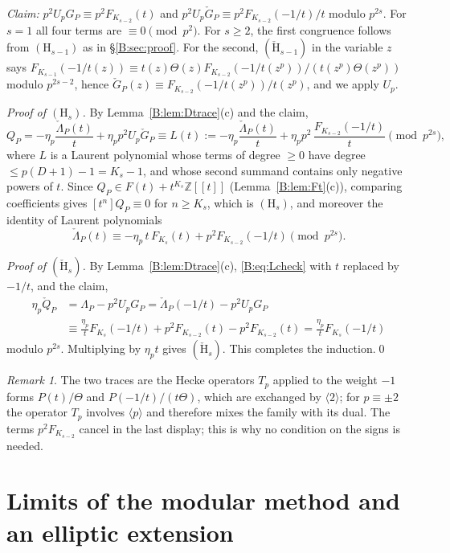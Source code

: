 \documentclass[11pt,a4paper]{article}
\theoremstyle{definition}\newtheorem{definition}[theorem]{Definition}
\theoremstyle{remark}\newtheorem{remark}[theorem]{Remark}
\newcommand{\Z}{\mathbb Z}
\numberwithin{equation}{section}
\begin{document}
\emph{Claim:} $p^2U_pG_P\equiv p^2F_{K_{s-2}}(t)$ and $p^2U_p\check G_P\equiv p^2F_{K_{s-2}}(-1/t)/t$ modulo $p^{2s}$. For
$s=1$ all four terms are $\equiv0\pmod{p^2}$. For $s\ge2$, the first congruence follows from $(\mathrm H_{s-1})$ as in
\S\ref{B:sec:proof}. For the second, $(\check{\mathrm H}_{s-1})$ in the variable $z$ says
$F_{K_{s-1}}(-1/t(z))\equiv t(z)\Theta(z)F_{K_{s-2}}(-1/t(z^p))/(t(z^p)\Theta(z^p))$ modulo $p^{2s-2}$, hence
$\check G_P(z)\equiv F_{K_{s-2}}(-1/t(z^p))/t(z^p)$, and we apply $U_p$.

\emph{Proof of $(\mathrm H_s)$.} By Lemma~\ref{B:lem:Dtrace}(c) and the claim,
\[
Q_P=-\eta_p\frac{\check\Lambda_P(t)}t+\eta_pp^2U_p\check G_P\equiv L(t):=-\eta_p\frac{\check\Lambda_P(t)}t+\eta_pp^2\,
\frac{F_{K_{s-2}}(-1/t)}t\pmod{p^{2s}},
\]
where $L$ is a Laurent polynomial whose terms of degree $\ge0$ have degree $\le p(D+1)-1=K_s-1$, and whose second summand
contains only negative powers of $t$. Since $Q_P\in F(t)+t^{K_s}\Z[[t]]$ (Lemma~\ref{B:lem:Ft}(c)), comparing coefficients
gives $[t^n]Q_P\equiv0$ for $n\ge K_s$, which is $(\mathrm H_s)$, and moreover the identity of Laurent polynomials
\begin{equation}\label{B:eq:Lcheck}
\check\Lambda_P(t)\equiv-\eta_p\,t\,F_{K_s}(t)+p^2F_{K_{s-2}}(-1/t)\pmod{p^{2s}}.
\end{equation}

\emph{Proof of $(\check{\mathrm H}_s)$.} By Lemma~\ref{B:lem:Dtrace}(c), \eqref{B:eq:Lcheck} with $t$ replaced by $-1/t$, and the
claim,
\begin{align*}
\eta_p\check Q_P&=\Lambda_P-p^2U_pG_P=\check\Lambda_P(-1/t)-p^2U_pG_P\\
&\equiv\frac{\eta_p}tF_{K_s}(-1/t)+p^2F_{K_{s-2}}(t)-p^2F_{K_{s-2}}(t)=\frac{\eta_p}tF_{K_s}(-1/t)
\end{align*}
modulo $p^{2s}$. Multiplying by $\eta_pt$ gives $(\check{\mathrm H}_s)$. This completes the induction.\qed

\begin{remark}
The two traces are the Hecke operators $T_p$ applied to the weight $-1$ forms $P(t)/\Theta$ and $P(-1/t)/(t\Theta)$, which
are exchanged by $\langle2\rangle$; for $p\equiv\pm2$ the operator $T_p$ involves $\langle p\rangle$ and therefore mixes the
family with its dual. The terms $p^2F_{K_{s-2}}$ cancel in the last display; this is why no condition on the signs is needed.
\end{remark}

\section{Limits of the modular method and an elliptic extension}\label{B:source-main-8}\label{B:sec:open}
\end{document}
